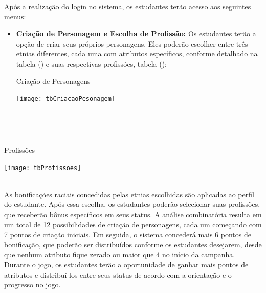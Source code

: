 Após a realização do login no sistema, os estudantes terão acesso aos seguintes menus:
\\
\begin{itemize}
\\
  \item \textbf{Criação de Personagem e Escolha de Profissão:} Os estudantes terão a opção de criar seus próprios personagens. Eles poderão escolher entre três etnias diferentes, cada uma com atributos específicos, conforme detalhado na tabela () e suas respectivas profissões, tabela ():
\\
\begin{table}[!h]
\centering
{}
\caption{Criação de Personagens}%
\label{grph:CriPer}
\texttt{[image: tbCriacaoPesonagem]}
\\
\end{table}
\\
\end{itemize}

\\
\begin{table}[!h]
\centering
{}
\caption{Profissões}%
\label{grph:Prof}
\texttt{[image: tbProfissoes]}
\\
\end{table}
\\

As bonificações raciais concedidas pelas etnias escolhidas são aplicadas ao perfil do estudante. Após essa escolha, os estudantes poderão selecionar suas profissões, que receberão bônus específicos em seus status. A análise combinatória resulta em um total de 12 possibilidades de criação de personagens, cada um começando com 7 pontos de criação iniciais. Em seguida, o sistema concederá mais 6 pontos de bonificação, que poderão ser distribuídos conforme os estudantes desejarem, desde que nenhum atributo fique zerado ou maior que 4 no início da campanha. Durante o jogo, os estudantes terão a oportunidade de ganhar mais pontos de atributos e distribuí-los entre seus status de acordo com a orientação e o progresso no jogo. 
\\


